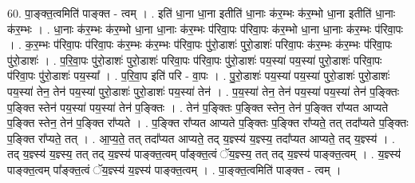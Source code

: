 \documentclass[17pt]{extarticle}
\begin{document}
60. पा॒ङ्क्त॒त्वमिति॑ पाङ्क्त - त्वम् । . इति॑ धा॒ना धा॒ना इतीति॑ धा॒नाः क॑र॒म्भः क॑र॒म्भो धा॒ना इतीति॑ धा॒नाः क॑र॒म्भः । . धा॒नाः क॑र॒म्भः क॑र॒म्भो धा॒ना धा॒नाः क॑र॒म्भः प॑रिवा॒पः प॑रिवा॒पः क॑र॒म्भो धा॒ना धा॒नाः क॑र॒म्भः प॑रिवा॒पः । . क॒र॒म्भः प॑रिवा॒पः प॑रिवा॒पः क॑र॒म्भः क॑र॒म्भः प॑रिवा॒पः पु॑रो॒डाशः॑ पुरो॒डाशः॑ परिवा॒पः क॑र॒म्भः क॑र॒म्भः प॑रिवा॒पः पु॑रो॒डाशः॑ । . प॒रि॒वा॒पः पु॑रो॒डाशः॑ पुरो॒डाशः॑ परिवा॒पः प॑रिवा॒पः पु॑रो॒डाशः॑ पय॒स्या॑ पय॒स्या॑ पुरो॒डाशः॑ परिवा॒पः प॑रिवा॒पः पु॑रो॒डाशः॑ पय॒स्या᳚ । . प॒रि॒वा॒प इति॑ परि - वा॒पः । . पु॒रो॒डाशः॑ पय॒स्या॑ पय॒स्या॑ पुरो॒डाशः॑ पुरो॒डाशः॑ पय॒स्या॑ तेन॒ तेन॑ पय॒स्या॑ पुरो॒डाशः॑ पुरो॒डाशः॑ पय॒स्या॑ तेन॑ । . प॒य॒स्या॑ तेन॒ तेन॑ पय॒स्या॑ पय॒स्या॑ तेन॑ प॒ङ्क्तिः प॒ङ्क्ति स्तेन॑ पय॒स्या॑ पय॒स्या॑ तेन॑ प॒ङ्क्तिः । . तेन॑ प॒ङ्क्तिः प॒ङ्क्ति स्तेन॒ तेन॑ प॒ङ्क्ति रा᳚प्यत आप्यते प॒ङ्क्ति स्तेन॒ तेन॑ प॒ङ्क्ति रा᳚प्यते । . प॒ङ्क्ति रा᳚प्यत आप्यते प॒ङ्क्तिः प॒ङ्क्ति रा᳚प्यते॒ तत् तदा᳚प्यते प॒ङ्क्तिः प॒ङ्क्ति रा᳚प्यते॒ तत् । . आ॒प्य॒ते॒ तत् तदा᳚प्यत आप्यते॒ तद् य॒ज्ञ्स्य॑ य॒ज्ञ्स्य॒ तदा᳚प्यत आप्यते॒ तद् य॒ज्ञ्स्य॑ । . तद् य॒ज्ञ्स्य॑ य॒ज्ञ्स्य॒ तत् तद् य॒ज्ञ्स्य॑ पाङ्क्त॒त्वम् पा᳚ङ्क्त॒त्वं ॅय॒ज्ञ्स्य॒ तत् तद् य॒ज्ञ्स्य॑ पाङ्क्त॒त्वम् । . य॒ज्ञ्स्य॑ पाङ्क्त॒त्वम् पा᳚ङ्क्त॒त्वं ॅय॒ज्ञ्स्य॑ य॒ज्ञ्स्य॑ पाङ्क्त॒त्वम् । . पा॒ङ्क्त॒त्वमिति॑ पाङ्क्त - त्वम् । \newline
\pagebreak
\end{document}

